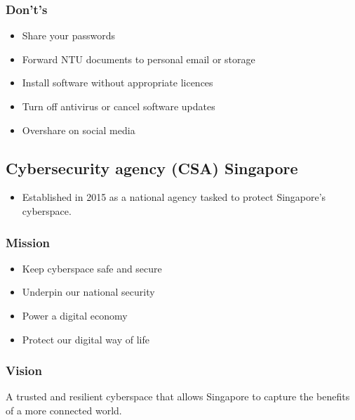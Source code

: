 \documentclass[11pt]{article}
\begin{document}
\subsubsection{Don't's}
\label{sec:org14ae54d}
\begin{itemize}
\item Share your passwords
\item Forward NTU documents to personal email or storage
\item Install software without appropriate licences
\item Turn off antivirus or cancel software updates
\item Overshare on social media
\end{itemize}

\subsection{Cybersecurity agency (CSA) Singapore}
\label{sec:org65f6fef}
\begin{itemize}
\item Established in 2015 as a national agency tasked to protect Singapore's cyberspace.
\end{itemize}

\subsubsection{Mission}
\label{sec:org9c01a26}
\begin{itemize}
\item Keep cyberspace safe and secure
\item Underpin our national security
\item Power a digital economy
\item Protect our digital way of life
\end{itemize}

\subsubsection{Vision}
\label{sec:orgb396091}
A trusted and resilient cyberspace that allows Singapore to capture the benefits of a more connected world.
\end{document}
